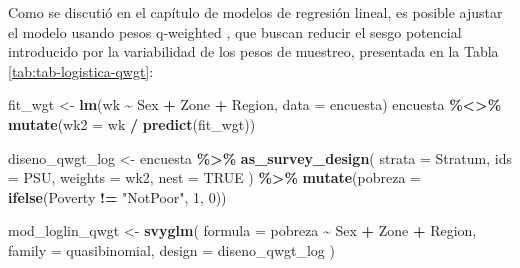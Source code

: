 \documentclass[
  spanish,
  12pt,
]{book}
\newenvironment{Shaded}{\begin{snugshade}}{\end{snugshade}}
\newcommand{\AttributeTok}[1]{\textcolor[rgb]{0.13,0.29,0.53}{#1}}
\newcommand{\ConstantTok}[1]{\textcolor[rgb]{0.56,0.35,0.01}{#1}}
\newcommand{\DecValTok}[1]{\textcolor[rgb]{0.00,0.00,0.81}{#1}}
\newcommand{\FunctionTok}[1]{\textcolor[rgb]{0.13,0.29,0.53}{\textbf{#1}}}
\newcommand{\NormalTok}[1]{#1}
\newcommand{\OtherTok}[1]{\textcolor[rgb]{0.56,0.35,0.01}{#1}}
\newcommand{\SpecialCharTok}[1]{\textcolor[rgb]{0.81,0.36,0.00}{\textbf{#1}}}
\newcommand{\StringTok}[1]{\textcolor[rgb]{0.31,0.60,0.02}{#1}}
\begin{document}
Como se discutió en el capítulo de modelos de regresión lineal, es posible ajustar el modelo usando pesos q-weighted \citep{pfeffermann2011modelling}, que buscan reducir el sesgo potencial introducido por la variabilidad de los pesos de muestreo, presentada en la Tabla \ref{tab:tab-logistica-qwgt}:

\begin{Shaded}
\begin{Highlighting}[]
\NormalTok{fit\_wgt }\OtherTok{\textless{}{-}} \FunctionTok{lm}\NormalTok{(wk }\SpecialCharTok{\textasciitilde{}}\NormalTok{ Sex }\SpecialCharTok{+}\NormalTok{ Zone }\SpecialCharTok{+}\NormalTok{ Region, }\AttributeTok{data =}\NormalTok{ encuesta)}
\NormalTok{encuesta }\SpecialCharTok{\%\textless{}\textgreater{}\%} \FunctionTok{mutate}\NormalTok{(}\AttributeTok{wk2 =}\NormalTok{ wk }\SpecialCharTok{/} \FunctionTok{predict}\NormalTok{(fit\_wgt))}

\NormalTok{diseno\_qwgt\_log }\OtherTok{\textless{}{-}}\NormalTok{ encuesta }\SpecialCharTok{\%\textgreater{}\%}
  \FunctionTok{as\_survey\_design}\NormalTok{(}
    \AttributeTok{strata  =}\NormalTok{ Stratum,}
    \AttributeTok{ids     =}\NormalTok{ PSU,}
    \AttributeTok{weights =}\NormalTok{ wk2,}
    \AttributeTok{nest    =} \ConstantTok{TRUE}
\NormalTok{  ) }\SpecialCharTok{\%\textgreater{}\%}
  \FunctionTok{mutate}\NormalTok{(}\AttributeTok{pobreza =} \FunctionTok{ifelse}\NormalTok{(Poverty }\SpecialCharTok{!=} \StringTok{"NotPoor"}\NormalTok{, }\DecValTok{1}\NormalTok{, }\DecValTok{0}\NormalTok{))}
\end{Highlighting}
\end{Shaded}

\begin{Shaded}
\begin{Highlighting}[]
\NormalTok{mod\_loglin\_qwgt }\OtherTok{\textless{}{-}} \FunctionTok{svyglm}\NormalTok{(}
  \AttributeTok{formula =}\NormalTok{ pobreza }\SpecialCharTok{\textasciitilde{}}\NormalTok{ Sex }\SpecialCharTok{+}\NormalTok{ Zone }\SpecialCharTok{+}\NormalTok{ Region,}
  \AttributeTok{family  =}\NormalTok{ quasibinomial,}
  \AttributeTok{design  =}\NormalTok{ diseno\_qwgt\_log}
\NormalTok{)}
\end{Highlighting}
\end{Shaded}
\end{document}
